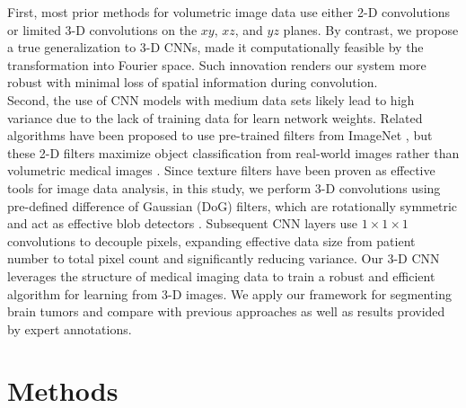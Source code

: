 \documentclass{llncs}
\begin{document}
\indent First, most prior methods for volumetric image data use either 2-D convolutions or limited 3-D convolutions on the $xy$, $xz$, and $yz$ planes. By contrast, we propose a true generalization to 3-D CNNs, made it computationally feasible by the transformation into Fourier space. Such innovation renders our system more robust with minimal loss of spatial information during convolution. \\
\indent Second, the use of CNN models with medium data sets likely lead to high variance due to the lack of training data for learn network weights. Related algorithms have been proposed to use pre-trained filters from ImageNet \cite{Deng09}, but these 2-D filters maximize object classification from real-world images rather than volumetric medical images \cite{Deng09,Krizhevsky12,Bar15}. Since texture filters have been proven as effective tools for image data analysis, in this study, we perform 3-D convolutions using pre-defined difference of Gaussian (DoG) filters, which are rotationally symmetric and act as effective blob detectors \cite{sift}.  Subsequent CNN layers use $1 \times 1 \times 1$ convolutions to decouple pixels, expanding effective data size from patient number to total pixel count and significantly reducing variance. Our 3-D CNN leverages the structure of medical imaging data to train a robust and efficient algorithm for learning from 3-D images. We apply our framework for segmenting brain tumors and compare with previous approaches as well as results provided by expert annotations. 



\section{Methods}
\end{document}
